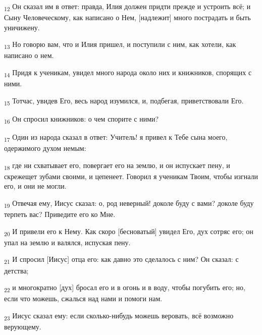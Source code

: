 \begin{tcolorbox}
\textsubscript{12} Он сказал им в ответ: правда, Илия должен придти прежде и устроить всё; и Сыну Человеческому, как написано о Нем, [надлежит] много пострадать и быть уничижену.
\end{tcolorbox}
\begin{tcolorbox}
\textsubscript{13} Но говорю вам, что и Илия пришел, и поступили с ним, как хотели, как написано о нем.
\end{tcolorbox}
\begin{tcolorbox}
\textsubscript{14} Придя к ученикам, увидел много народа около них и книжников, спорящих с ними.
\end{tcolorbox}
\begin{tcolorbox}
\textsubscript{15} Тотчас, увидев Его, весь народ изумился, и, подбегая, приветствовали Его.
\end{tcolorbox}
\begin{tcolorbox}
\textsubscript{16} Он спросил книжников: о чем спорите с ними?
\end{tcolorbox}
\begin{tcolorbox}
\textsubscript{17} Один из народа сказал в ответ: Учитель! я привел к Тебе сына моего, одержимого духом немым:
\end{tcolorbox}
\begin{tcolorbox}
\textsubscript{18} где ни схватывает его, повергает его на землю, и он испускает пену, и скрежещет зубами своими, и цепенеет. Говорил я ученикам Твоим, чтобы изгнали его, и они не могли.
\end{tcolorbox}
\begin{tcolorbox}
\textsubscript{19} Отвечая ему, Иисус сказал: о, род неверный! доколе буду с вами? доколе буду терпеть вас? Приведите его ко Мне.
\end{tcolorbox}
\begin{tcolorbox}
\textsubscript{20} И привели его к Нему. Как скоро [бесноватый] увидел Его, дух сотряс его; он упал на землю и валялся, испуская пену.
\end{tcolorbox}
\begin{tcolorbox}
\textsubscript{21} И спросил [Иисус] отца его: как давно это сделалось с ним? Он сказал: с детства;
\end{tcolorbox}
\begin{tcolorbox}
\textsubscript{22} и многократно [дух] бросал его и в огонь и в воду, чтобы погубить его; но, если что можешь, сжалься над нами и помоги нам.
\end{tcolorbox}
\begin{tcolorbox}
\textsubscript{23} Иисус сказал ему: если сколько-нибудь можешь веровать, всё возможно верующему.
\end{tcolorbox}
